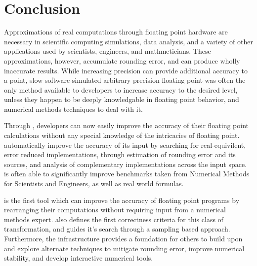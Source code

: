 \documentclass[paper.tex]{subfiles}
\begin{document}
\section{Conclusion}
\label{sec:conclusion}

Approximations of real computations through floating point hardware
  are necessary in scientific computing simulations, data analysis,
  and a variety of other applications used by scientists,
  engineers, and mathmeticians.
These approximations, however, accumulate rounding error,
  and can produce wholly inaccurate results.
While increasing precision can provide additional accuracy to a point,
  slow software-simulated arbitrary precision floating point
  was often the only method available to developers to increase accuracy
  to the desired level,
  unless they happen to be deeply knowledgable in floating point behavior,
  and numerical methods techniques to deal with it.

Through \casio, developers can now easily improve the accuracy
  of their floating point calculations
  without any special knowledge of the intricacies of floating point.
\casio automatically improve the accuracy of its input
  by searching for real-equivilent, error reduced implementations,
  through estimation of rounding error and its sources,
  and analysis of complementary implementations across the input space.
\casio is often able to significantly improve
  benchmarks taken from Numerical Methods for Scientists and Engineers,
  as well as real world formulas.

\casio is the first tool
  which can improve the accuracy of floating point programs
  by rearranging their computations
  without requiring input from a numerical methods expert.
\casio also defines the first correctness criteria for
  this class of transformation,
  and guides it's search through a sampling based approach.
Furthermore, the \casio infrastructure provides
  a foundation for others to build upon
  and explore alternate techniques to mitigate rounding error,
  improve numerical stability,
  and develop interactive numerical tools.
\end{document}
